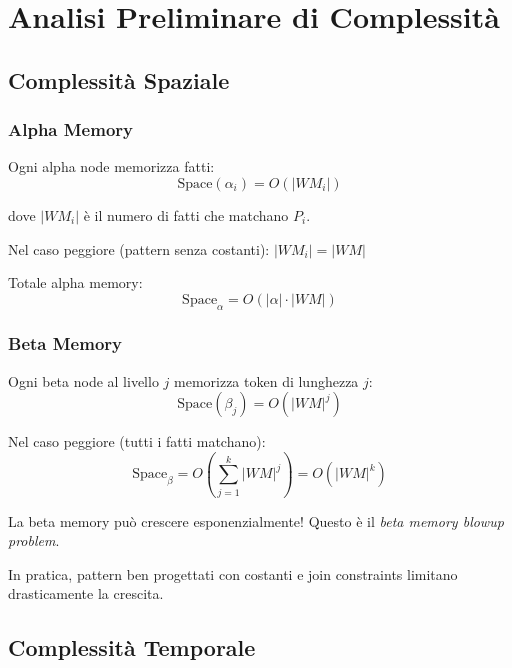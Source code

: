 \section{Analisi Preliminare di Complessità}

\subsection{Complessità Spaziale}

\subsubsection{Alpha Memory}

Ogni alpha node memorizza fatti:
\begin{equation}
\text{Space}(\alpha_i) = O(|WM_i|)
\end{equation}

dove $|WM_i|$ è il numero di fatti che matchano $P_i$.

Nel caso peggiore (pattern senza costanti): $|WM_i| = |WM|$

Totale alpha memory:
\begin{equation}
\text{Space}_\alpha = O(|\alpha| \cdot |WM|)
\end{equation}

\subsubsection{Beta Memory}

Ogni beta node al livello $j$ memorizza token di lunghezza $j$:
\begin{equation}
\text{Space}(\beta_j) = O(|WM|^j)
\end{equation}

Nel caso peggiore (tutti i fatti matchano):
\begin{equation}
\text{Space}_\beta = O\left(\sum_{j=1}^{k} |WM|^j\right) = O(|WM|^k)
\end{equation}

\begin{warningbox}
La beta memory può crescere esponenzialmente! Questo è il \textit{beta memory blowup problem}.

In pratica, pattern ben progettati con costanti e join constraints limitano drasticamente la crescita.
\end{warningbox}

\subsection{Complessità Temporale}

